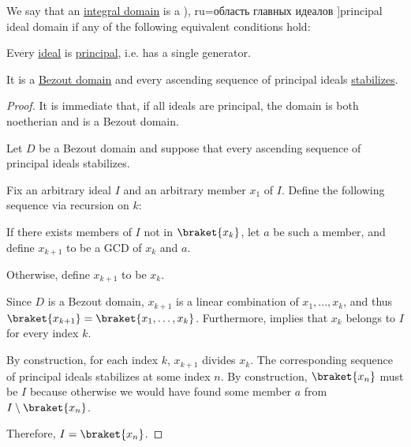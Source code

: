 \begin{definition}\label{def:principal_ideal_domain}
  We say that an \hyperref[def:integral_domain]{integral domain} is a \term[bg=област на главни идеали (\cite[def. VI.3]{ГеновМиховскиМоллов1991Алгебра}), ru=область главных идеалов \cite[def. 9.3]{Винберг2014Алгебра}]{principal ideal domain} if any of the following equivalent conditions hold:
  \begin{thmenum}
     Every \hyperref[def:semiring_ideal]{ideal} is \hyperref[def:semiring_ideal/principal]{principal}, i.e. has a single generator.

     It is a \hyperref[def:bezout_domain]{Bezout domain} and every ascending sequence of principal ideals \hyperref[def:stabilizing_sequence]{stabilizes}.
  \end{thmenum}
\end{definition}
\begin{proof}
   It is immediate that, if all ideals are principal, the domain is both noetherian and is a Bezout domain.

   Let \( D \) be a Bezout domain and suppose that every ascending sequence of principal ideals stabilizes.

  Fix an arbitrary ideal \( I \) and an arbitrary member \( x_1 \) of \( I \). Define the following sequence via recursion on \( k \):
  \begin{displayquote}
    If there exists members of \( I \) not in \( \braket{ x_k } \), let \( a \) be such a member, and define \( x_{k+1} \) to be a GCD of \( x_k \) and \( a \).

    Otherwise, define \( x_{k+1} \) to be \( x_k \).
  \end{displayquote}

  Since \( D \) is a Bezout domain, \( x_{k+1} \) is a linear combination of \( x_1, \ldots, x_k \), and thus \( \braket{ x_{k+1} } = \braket{ x_1, \ldots, x_k } \). Furthermore,  implies that \( x_k \) belongs to \( I \) for every index \( k \).

  By construction, for each index \( k \), \( x_{k+1} \) divides \( x_k \). The corresponding sequence of principal ideals stabilizes at some index \( n \). By construction, \( \braket{ x_n } \) must be \( I \) because otherwise we would have found some member \( a \) from \( I \setminus \braket{ x_n } \).

  Therefore, \( I = \braket{ x_n } \).
\end{proof}

